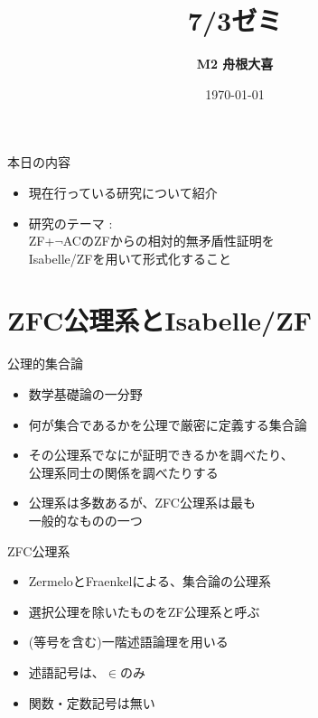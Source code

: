 \documentclass[17pt,aspectratio=169,xcolor=dvipsnames,table,dvipdfmx]{beamer}
\title{7/3ゼミ}
\author{\textbf{M2 舟根大喜}}
\date{\today}
\theoremstyle{definition}
\begin{document}
\maketitle

\begin{frame} {本日の内容}
    \begin{itemize}
        \item 現在行っている研究について紹介
        \item 研究のテーマ : \\ZF+$\neg$ACのZFからの相対的無矛盾性証明を\\Isabelle/ZFを用いて形式化すること
    \end{itemize}
\end{frame}

\frame{\tableofcontents[hideallsubsections]}

\section{ZFC公理系とIsabelle/ZF}

\begin{frame}{公理的集合論}
    \begin{itemize}
        \item 数学基礎論の一分野
        \item 何が集合であるかを公理で厳密に定義する集合論
        \item その公理系でなにが証明できるかを調べたり、\\
              公理系同士の関係を調べたりする
        \item 公理系は多数あるが、ZFC公理系は最も\\一般的なものの一つ
    \end{itemize}
\end{frame}

\begin{frame}{ZFC公理系}
    \begin{itemize}
        \item ZermeloとFraenkelによる、集合論の公理系 %
        \item 選択公理を除いたものをZF公理系と呼ぶ
        \item {\small (等号を含む)}一階述語論理を用いる
        \item 述語記号は、$\in$のみ %
        \item 関数・定数記号は無い %
    \end{itemize}
\end{frame}
\end{document}
